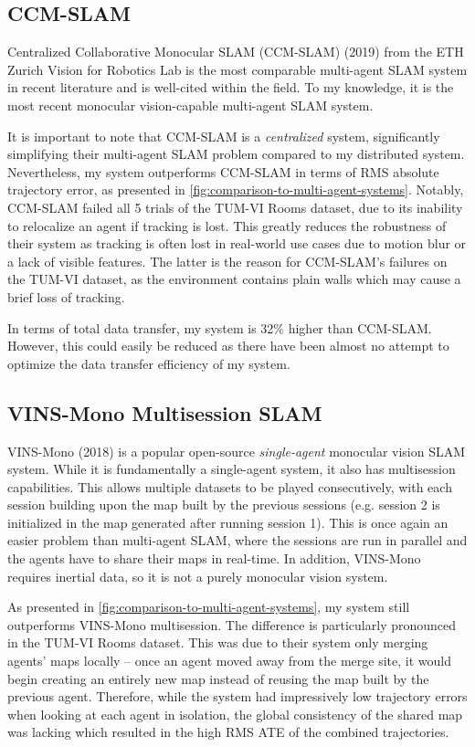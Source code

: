 \subsection{CCM-SLAM}
\label{sec:ccm-slam}
Centralized Collaborative Monocular SLAM (CCM-SLAM) (2019) from the ETH Zurich Vision for Robotics Lab \autocite{schmuck2019ccm} is the most comparable multi-agent SLAM system in recent literature and is well-cited within the field. To my knowledge, it is the most recent monocular vision-capable multi-agent SLAM system.

It is important to note that CCM-SLAM is a \textit{centralized} system, significantly simplifying their multi-agent SLAM problem compared to my distributed system. Nevertheless, my system outperforms CCM-SLAM in terms of RMS absolute trajectory error, as presented in \autoref{fig:comparison-to-multi-agent-systems}. Notably, CCM-SLAM failed all 5 trials of the TUM-VI Rooms dataset, due to its inability to relocalize an agent if tracking is lost. This greatly reduces the robustness of their system as tracking is often lost in real-world use cases due to motion blur or a lack of visible features. The latter is the reason for CCM-SLAM's failures on the TUM-VI dataset, as the environment contains plain walls which may cause a brief loss of tracking.

In terms of total data transfer, my system is 32\% higher than CCM-SLAM. However, this could easily be reduced as there have been almost no attempt to optimize the data transfer efficiency of my system.

\subsection{VINS-Mono Multisession SLAM}
VINS-Mono (2018) \autocite{8421746} is a popular open-source \textit{single-agent} monocular vision SLAM system. While it is fundamentally a single-agent system, it also has multisession capabilities. This allows multiple datasets to be played consecutively, with each session building upon the map built by the previous sessions (e.g. session 2 is initialized in the map generated after running session 1). This is once again an easier problem than multi-agent SLAM, where the sessions are run in parallel and the agents have to share their maps in real-time. In addition, VINS-Mono requires inertial data, so it is not a purely monocular vision system.

As presented in \autoref{fig:comparison-to-multi-agent-systems}, my system still outperforms VINS-Mono multisession. The difference is particularly pronounced in the TUM-VI Rooms dataset. This was due to their system only merging agents' maps locally – once an agent moved away from the merge site, it would begin creating an entirely new map instead of reusing the map built by the previous agent. Therefore, while the system had impressively low trajectory errors when looking at each agent in isolation, the global consistency of the shared map was lacking which resulted in the high RMS ATE of the combined trajectories.


